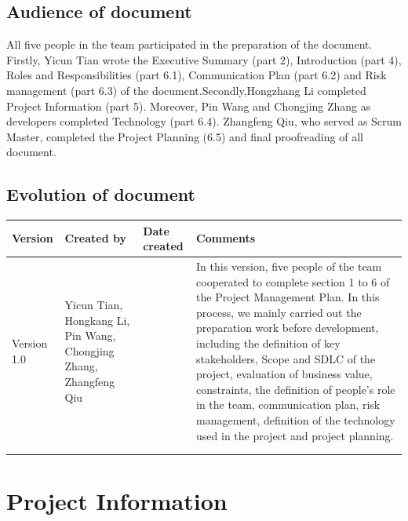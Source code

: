 \documentclass{report}
\begin{document}
\section{Audience of document}
   All five people in the team participated in the preparation of the document. Firstly, Yicun Tian wrote the Executive Summary (part 2), Introduction (part 4), Roles and Responsibilities (part 6.1), Communication Plan (part 6.2) and Risk management (part 6.3) of the document.Secondly,Hongzhang Li completed Project Information (part 5). Moreover, Pin Wang and Chongjing Zhang as developers completed Technology (part 6.4). Zhangfeng Qiu, who served as Scrum Master, completed the Project Planning (6.5) and final proofreading of all document.

\section{Evolution of document}
\begin{tabularx}{0.95\linewidth}{%
  l%
  >{\raggedright\arraybackslash}p{2.2cm}%
  >{\raggedright\arraybackslash}p{1.5cm}%
  >{\raggedright\arraybackslash}X}
  \toprule
  Version & Created by & Date created & Comments\\
  \midrule
  Version 1.0
  & Yicun Tian, Hongkang Li, Pin Wang, Chongjing Zhang, Zhangfeng Qiu
  & 4.27
  & In this version, five people of the team cooperated to complete section 1 to 6 of the Project Management Plan. In this process, we mainly carried out the preparation work before development, including the definition of key stakeholders, Scope and SDLC of the project, evaluation of business value, constraints, the definition of people's role in the team, communication plan, risk management, definition of the technology used in the project and project planning.
  \\
  \bottomrule
  \\
  \caption{Evolution of document}  
  \label{tab:evolutionOfDocument}
\end{tabularx}

\chapter{Project Information}
\end{document}
